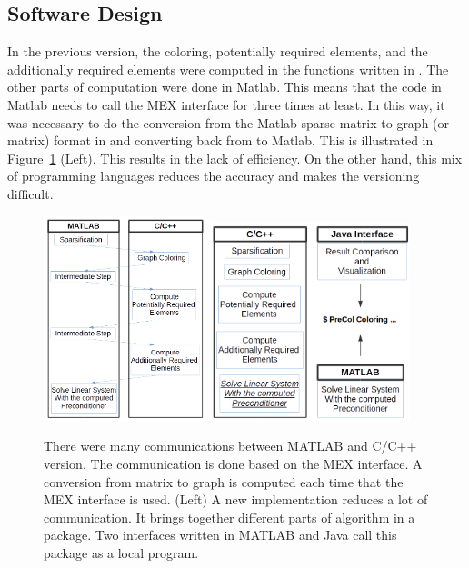 \documentclass[12pt, twoside]{book}
\begin{document}
\subsection{Software Design}
In the previous version, the coloring,
potentially required elements, and the additionally required elements
were computed in the functions written in .
The other parts of computation were done in Matlab.
This means that the code in Matlab needs to call the
MEX interface for three times at least.
In this way, it was necessary to do the conversion from the Matlab sparse
matrix to graph (or matrix) format in 
and converting back from  to Matlab.
This is illustrated in Figure~\ref{f.structure} (Left).
This results in the lack of efficiency. On the other hand,
this mix of programming languages reduces
the accuracy and makes the versioning difficult.
\begin{figure}
\centering
\includegraphics[width=0.42\textwidth]{old_struct}
\hfill
\includegraphics[width=0.52\textwidth]{new_struct}
\caption{There were many communications between MATLAB and C/C++ version. The communication
is done based on the MEX interface. A conversion from matrix to graph is computed
each time that the MEX interface is used. (Left) A new implementation reduces a lot of communication.
It brings together different parts of algorithm in a package. Two interfaces written
in MATLAB and Java call this package as a local program.}
\label{f.structure}
\end{figure}
\end{document}
